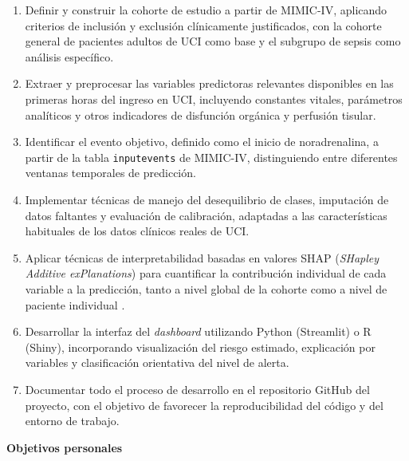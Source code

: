 \begin{enumerate}
  \item Definir y construir la cohorte de estudio a partir de MIMIC-IV, aplicando criterios de inclusión y exclusión clínicamente justificados, con la cohorte general de pacientes adultos de UCI como base y el subgrupo de sepsis como análisis específico.

  \item Extraer y preprocesar las variables predictoras relevantes disponibles en las primeras horas del ingreso en UCI, incluyendo constantes vitales, parámetros analíticos y otros indicadores de disfunción orgánica y perfusión tisular.

  \item Identificar el evento objetivo, definido como el inicio de noradrenalina, a partir de la tabla \texttt{inputevents} de MIMIC-IV, distinguiendo entre diferentes ventanas temporales de predicción.

  \item Implementar técnicas de manejo del desequilibrio de clases, imputación de datos faltantes y evaluación de calibración, adaptadas a las características habituales de los datos clínicos reales de UCI.

  \item Aplicar técnicas de interpretabilidad basadas en valores SHAP (\textit{SHapley Additive exPlanations}) para cuantificar la contribución individual de cada variable a la predicción, tanto a nivel global de la cohorte como a nivel de paciente individual \cite{lundberg2017}.

  \item Desarrollar la interfaz del \textit{dashboard} utilizando Python (Streamlit) o R (Shiny), incorporando visualización del riesgo estimado, explicación por variables y clasificación orientativa del nivel de alerta.

  \item Documentar todo el proceso de desarrollo en el repositorio GitHub del proyecto, con el objetivo de favorecer la reproducibilidad del código y del entorno de trabajo.
\end{enumerate}

\textbf{Objetivos personales}

